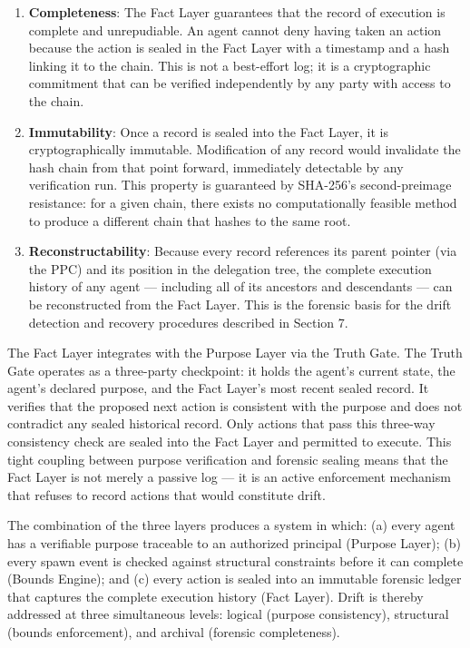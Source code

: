 \begin{enumerate}
    \item \textbf{Completeness}: The Fact Layer guarantees that the record of execution is complete and unrepudiable. An agent cannot deny having taken an action because the action is sealed in the Fact Layer with a timestamp and a hash linking it to the chain. This is not a best-effort log; it is a cryptographic commitment that can be verified independently by any party with access to the chain.
    \item \textbf{Immutability}: Once a record is sealed into the Fact Layer, it is cryptographically immutable. Modification of any record would invalidate the hash chain from that point forward, immediately detectable by any verification run. This property is guaranteed by SHA-256's second-preimage resistance: for a given chain, there exists no computationally feasible method to produce a different chain that hashes to the same root.
    \item \textbf{Reconstructability}: Because every record references its parent pointer (via the PPC) and its position in the delegation tree, the complete execution history of any agent — including all of its ancestors and descendants — can be reconstructed from the Fact Layer. This is the forensic basis for the drift detection and recovery procedures described in Section 7.
\end{enumerate}

The Fact Layer integrates with the Purpose Layer via the Truth Gate. The Truth Gate operates as a three-party checkpoint: it holds the agent's current state, the agent's declared purpose, and the Fact Layer's most recent sealed record. It verifies that the proposed next action is consistent with the purpose and does not contradict any sealed historical record. Only actions that pass this three-way consistency check are sealed into the Fact Layer and permitted to execute. This tight coupling between purpose verification and forensic sealing means that the Fact Layer is not merely a passive log — it is an active enforcement mechanism that refuses to record actions that would constitute drift.

The combination of the three layers produces a system in which: (a) every agent has a verifiable purpose traceable to an authorized principal (Purpose Layer); (b) every spawn event is checked against structural constraints before it can complete (Bounds Engine); and (c) every action is sealed into an immutable forensic ledger that captures the complete execution history (Fact Layer). Drift is thereby addressed at three simultaneous levels: logical (purpose consistency), structural (bounds enforcement), and archival (forensic completeness).


